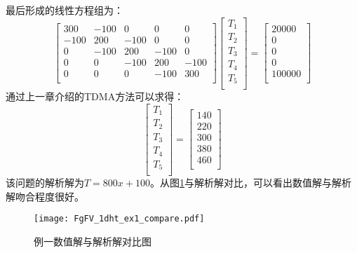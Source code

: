 最后形成的线性方程组为：
\begin{equation}
  \begin{bmatrix}
    300 & -100 & 0 & 0 & 0 \\
    -100 & 200 & -100 & 0 & 0 \\
    0 & -100 & 200 & -100 & 0 \\
    0 & 0 & -100 & 200 & -100  \\
    0 & 0 & 0 & -100 & 300 \\
  \end{bmatrix}
  \begin{bmatrix}
    T_{1} \\
    T_{2} \\
    T_{3} \\
    T_{4} \\
    T_{5} \\
  \end{bmatrix}
  =
  \begin{bmatrix}
    20000 \\
    0 \\
    0 \\
    0 \\
    100000 \\
  \end{bmatrix}
\end{equation}
通过上一章介绍的TDMA方法可以求得：
\begin{equation}
  \begin{bmatrix}
    T_{1} \\
    T_{2} \\
    T_{3} \\
    T_{4} \\
    T_{5} \\
  \end{bmatrix}
  =
  \begin{bmatrix}
    140 \\
    220 \\
    300 \\
    380 \\
    460 \\
  \end{bmatrix}
\end{equation}
该问题的解析解为$T=800x+100$。从图\ref{FgFV_1dht_ex1_compare}与解析解对比，可以看出数值解与解析解吻合程度很好。
\begin{figure}[H]
  \centering
  \texttt{[image: FgFV\_1dht\_ex1\_compare.pdf]}
  \caption{例一数值解与解析解对比图}
  \label{FgFV_1dht_ex1_compare}
\end{figure}

